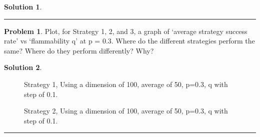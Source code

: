 \documentclass{article}
\theoremstyle{definition}
\newtheorem{problem}{Problem}
\def\fline{\rule{0.75\linewidth}{0.5pt}}
\newcommand{\finishline}{\vspace{-15pt}\begin{center}\fline\end{center}}
\newtheorem*{solution*}{Solution}
\newenvironment{solution}{\begin{solution*}}{{\finishline} \end{solution*}}
\begin{document}
\begin{solution}
\end{solution}

\smallskip

\begin{problem}
	Plot, for Strategy 1, 2, and 3, a graph of `average strategy success rate' vs `flammability q' at p = 0.3. Where do the different strategies perform the same? Where do they perform differently? Why?
\end{problem}

\smallskip

\begin{solution} \hfill \\
    \begin{figure}[h]
	\centering
	\caption{Strategy 1, Using a dimension of 100, average of 50, p=0.3, q with step of 0.1.} 
	\vspace{1cm}
	\end{figure} 
    
    \begin{figure}[h]
	\centering
	\caption{Strategy 2, Using a dimension of 100, average of 50, p=0.3, q with step of 0.1.}
	\end{figure}
    

\end{solution}
\end{document}
